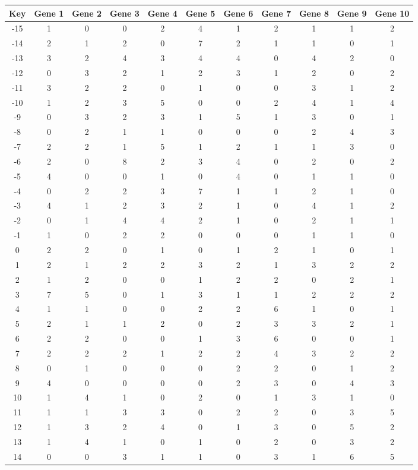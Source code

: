 \begin{tabular}{|c|c|c|c|c|c|c|c|c|c|c|}
\hline
Key & Gene 1 & Gene 2 & Gene 3 & Gene 4 & Gene 5 & Gene 6 & Gene 7 & Gene 8 & Gene 9 & Gene 10 \\
\hline
-15 & 1 & 0 & 0 & 2 & 4 & 1 & 2 & 1 & 1 & 2 \\
-14 & 2 & 1 & 2 & 0 & 7 & 2 & 1 & 1 & 0 & 1 \\
-13 & 3 & 2 & 4 & 3 & 4 & 4 & 0 & 4 & 2 & 0 \\
-12 & 0 & 3 & 2 & 1 & 2 & 3 & 1 & 2 & 0 & 2 \\
-11 & 3 & 2 & 2 & 0 & 1 & 0 & 0 & 3 & 1 & 2 \\
-10 & 1 & 2 & 3 & 5 & 0 & 0 & 2 & 4 & 1 & 4 \\
-9 & 0 & 3 & 2 & 3 & 1 & 5 & 1 & 3 & 0 & 1 \\
-8 & 0 & 2 & 1 & 1 & 0 & 0 & 0 & 2 & 4 & 3 \\
-7 & 2 & 2 & 1 & 5 & 1 & 2 & 1 & 1 & 3 & 0 \\
-6 & 2 & 0 & 8 & 2 & 3 & 4 & 0 & 2 & 0 & 2 \\
-5 & 4 & 0 & 0 & 1 & 0 & 4 & 0 & 1 & 1 & 0 \\
-4 & 0 & 2 & 2 & 3 & 7 & 1 & 1 & 2 & 1 & 0 \\
-3 & 4 & 1 & 2 & 3 & 2 & 1 & 0 & 4 & 1 & 2 \\
-2 & 0 & 1 & 4 & 4 & 2 & 1 & 0 & 2 & 1 & 1 \\
-1 & 1 & 0 & 2 & 2 & 0 & 0 & 0 & 1 & 1 & 0 \\
0 & 2 & 2 & 0 & 1 & 0 & 1 & 2 & 1 & 0 & 1 \\
1 & 2 & 1 & 2 & 2 & 3 & 2 & 1 & 3 & 2 & 2 \\
2 & 1 & 2 & 0 & 0 & 1 & 2 & 2 & 0 & 2 & 1 \\
3 & 7 & 5 & 0 & 1 & 3 & 1 & 1 & 2 & 2 & 2 \\
4 & 1 & 1 & 0 & 0 & 2 & 2 & 6 & 1 & 0 & 1 \\
5 & 2 & 1 & 1 & 2 & 0 & 2 & 3 & 3 & 2 & 1 \\
6 & 2 & 2 & 0 & 0 & 1 & 3 & 6 & 0 & 0 & 1 \\
7 & 2 & 2 & 2 & 1 & 2 & 2 & 4 & 3 & 2 & 2 \\
8 & 0 & 1 & 0 & 0 & 0 & 2 & 2 & 0 & 1 & 2 \\
9 & 4 & 0 & 0 & 0 & 0 & 2 & 3 & 0 & 4 & 3 \\
10 & 1 & 4 & 1 & 0 & 2 & 0 & 1 & 3 & 1 & 0 \\
11 & 1 & 1 & 3 & 3 & 0 & 2 & 2 & 0 & 3 & 5 \\
12 & 1 & 3 & 2 & 4 & 0 & 1 & 3 & 0 & 5 & 2 \\
13 & 1 & 4 & 1 & 0 & 1 & 0 & 2 & 0 & 3 & 2 \\
14 & 0 & 0 & 3 & 1 & 1 & 0 & 3 & 1 & 6 & 5 \\
\hline
\end{tabular}